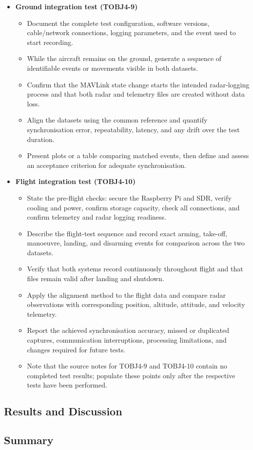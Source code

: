 \begin{itemize}
    \item \textbf{Ground integration test (TOBJ4-9)}
    \begin{itemize}
        \item Document the complete test configuration, software versions, cable/network connections, logging parameters, and the event used to start recording.
        \item While the aircraft remains on the ground, generate a sequence of identifiable events or movements visible in both datasets.
        \item Confirm that the MAVLink state change starts the intended radar-logging process and that both radar and telemetry files are created without data loss.
        \item Align the datasets using the common reference and quantify synchronisation error, repeatability, latency, and any drift over the test duration.
        \item Present plots or a table comparing matched events, then define and assess an acceptance criterion for adequate synchronisation.
    \end{itemize}

    \item \textbf{Flight integration test (TOBJ4-10)}
    \begin{itemize}
        \item State the pre-flight checks: secure the Raspberry Pi and SDR, verify cooling and power, confirm storage capacity, check all connections, and confirm telemetry and radar logging readiness.
        \item Describe the flight-test sequence and record exact arming, take-off, manoeuvre, landing, and disarming events for comparison across the two datasets.
        \item Verify that both systems record continuously throughout flight and that files remain valid after landing and shutdown.
        \item Apply the alignment method to the flight data and compare radar observations with corresponding position, altitude, attitude, and velocity telemetry.
        \item Report the achieved synchronisation accuracy, missed or duplicated captures, communication interruptions, processing limitations, and changes required for future tests.
        \item Note that the source notes for TOBJ4-9 and TOBJ4-10 contain no completed test results; populate these points only after the respective tests have been performed.
    \end{itemize}
\end{itemize}


\subsection{Results and Discussion}

\subsection{Summary}